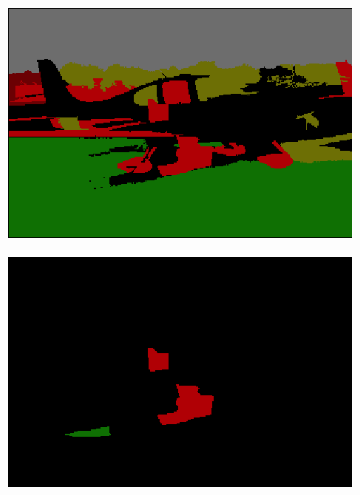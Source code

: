 \documentclass{article} %
\begin{document}
\begin{figure}[htb]
\begin{subfigure}[t]{0.19\textwidth}
		\caption{}
		\label{fig:prior_plane}
	\end{subfigure}
	\begin{subfigure}[t]{0.19\textwidth}
		\centering
		\includegraphics[width = \textwidth]{./img/4_14_s_final.png}
		\caption{}
		\label{fig:final_plane}
	\end{subfigure}
	\begin{subfigure}[t]{0.19\textwidth}
		\centering
		\includegraphics[width = \textwidth]{./img/4_14_s_changed.png}
		\caption{}
		\label{fig:changed_plane}
	\end{subfigure}


\end{figure}
\end{document}
